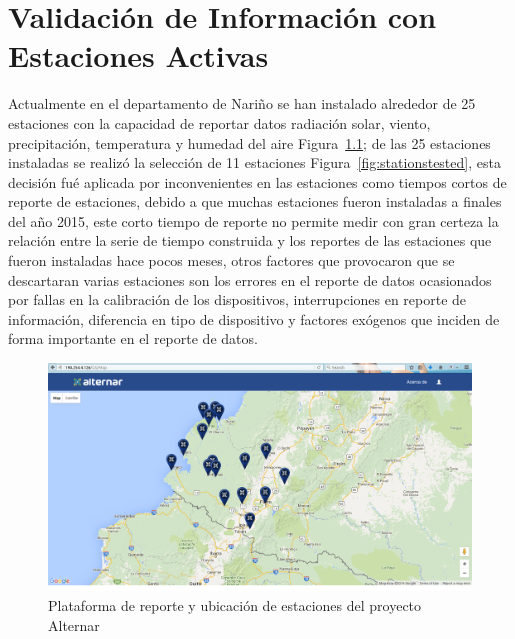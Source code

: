 \chapter{Validación de Información con Estaciones Activas}


Actualmente en el departamento de Nariño se han instalado alrededor de 25 estaciones con la capacidad de reportar datos radiación solar, viento, 
precipitación, temperatura y humedad del aire Figura~\ref{fig:stationsalternar}; de las 25 estaciones instaladas se realizó la selección de 11 
estaciones Figura~\ref{fig:stationstested}, esta decisión fué aplicada por inconvenientes en las estaciones como tiempos cortos de reporte de estaciones, debido 
a que muchas estaciones fueron instaladas a finales del año 2015, este corto tiempo de reporte no permite medir con gran certeza la relación entre 
la serie de tiempo construida y los reportes de las estaciones que fueron instaladas hace pocos meses, otros factores que provocaron que se descartaran varias 
estaciones son los errores en el reporte de datos ocasionados por fallas en la calibración de los dispositivos, interrupciones en reporte 
de información, diferencia en tipo de dispositivo y factores exógenos que inciden de forma importante en el reporte de datos. 
\begin{figure}[htb]
  \centering 
  \includegraphics[scale=0.27]{pictures/stationsalternar.png}
  \caption{Plataforma de reporte y ubicación de estaciones del proyecto Alternar}
  \label{fig:stationsalternar}
\end{figure}

